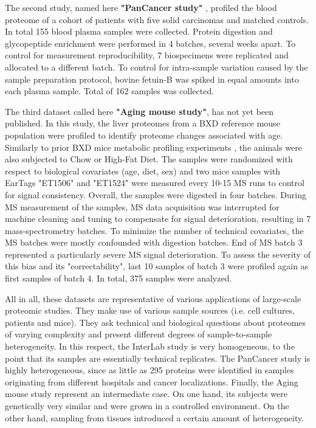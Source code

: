 \documentclass[num-refs]{wiley-article}
\begin{document}
The second study, named here \textbf{"PanCancer study"} \cite{Sajic2018}, profiled the blood proteome of a cohort of patients with five solid carcinomas and matched controls. In total 155 blood plasma samples were collected. Protein digestion and glycopeptide enrichment were performed in 4 batches, several weeks apart. To control for measurement reproducibility, 7 biospecimens were replicated and allocated to a different batch. To control for intra-sample variation caused by the sample preparation protocol, bovine fetuin-B was spiked in equal amounts into each plasma sample. Total of 162 samples was collected.

The third dataset called here \textbf{"Aging mouse study"}, has not yet been published. In this study, the liver proteomes from a BXD reference mouse population \cite{Peirce:2004aa} were profiled to identify proteome changes associated with age. Similarly to prior BXD mice metabolic profiling experiments \cite{Williams:2016aa}, the animals were also subjected to Chow or High-Fat Diet. The samples were randomized with respect to biological covariates (age, diet, sex) and two mice samples with EarTags "ET1506" and "ET1524" were measured every 10-15 MS runs to control for signal consistency. Overall, the samples were digested in four batches. During MS measurement of the samples, MS data acquisition was interrupted for machine cleaning and tuning to compensate for signal deterioration, resulting in 7 mass-spectrometry batches. To minimize the number of technical covariates, the MS batches were mostly confounded with digestion batches. End of MS batch 3 represented a particularly severe MS signal deterioration. To assess the severity of this bias and its "correctability", last 10 samples of batch 3 were profiled again as first samples of batch 4.  In total, 375 samples were analyzed.


All in all, these datasets are representative of various applications of large-scale proteomic studies. They make use of various sample sources (i.e. cell cultures, patients and mice). They ask technical and biological questions about proteomes of varying complexity and present different degrees of sample-to-sample heterogeneity. In this respect, the InterLab study is very homogeneous, to the point that its samples are essentially technical replicates. The PanCancer study is highly heterogeneous, since as little as 295 proteins were identified in samples originating from different hospitals and cancer localizations. Finally, the Aging mouse study represent an intermediate case. On one hand, its subjects were genetically very similar and were grown in a controlled environment. On the other hand, sampling from tissues introduced a certain amount of heterogeneity.
\end{document}

